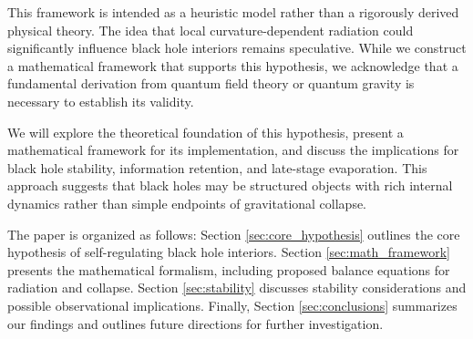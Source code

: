 This framework is intended as a heuristic model rather than a rigorously derived physical theory. The idea that local curvature-dependent radiation could significantly influence black hole interiors remains speculative. While we construct a mathematical framework that supports this hypothesis, we acknowledge that a fundamental derivation from quantum field theory or quantum gravity is necessary to establish its validity.

We will explore the theoretical foundation of this hypothesis, present a mathematical framework for its implementation, and discuss the implications for black hole stability, information retention, and late-stage evaporation. This approach suggests that black holes may be structured objects with rich internal dynamics rather than simple endpoints of gravitational collapse.

The paper is organized as follows: Section \ref{sec:core_hypothesis} outlines the core hypothesis of self-regulating black hole interiors. Section \ref{sec:math_framework} presents the mathematical formalism, including proposed balance equations for radiation and collapse. Section \ref{sec:stability} discusses stability considerations and possible observational implications. Finally, Section \ref{sec:conclusions} summarizes our findings and outlines future directions for further investigation.
